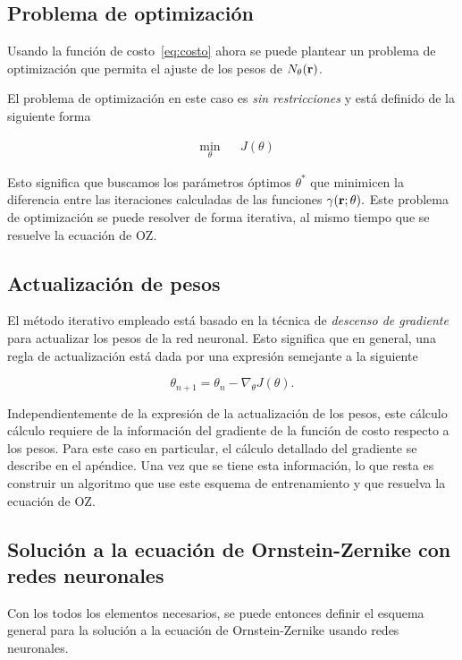 \subsection{Problema de optimización}
Usando la función de costo~\eqref{eq:costo} ahora se puede plantear un problema de optimización
que permita el ajuste de los pesos de $N_{\theta}(\mathbf{r})$.

El problema de optimización en este caso es \emph{sin restricciones} y está
definido de la siguiente forma

\begin{equation}
    \begin{aligned}
         & \underset{\theta}{\text{min}}
         &                               & J(\theta)
    \end{aligned}
    \label{eq:optimizacion}
\end{equation}

Esto significa que buscamos los parámetros óptimos $\theta^*$ que minimicen la diferencia
entre las iteraciones calculadas de las funciones $\gamma(\mathbf{r}; \theta).$
Este problema de optimización se puede resolver de forma iterativa, al mismo tiempo que
se resuelve la ecuación de OZ.

\subsection{Actualización de pesos}
El método iterativo empleado está basado en la técnica de \emph{descenso de gradiente}
para actualizar los pesos de la red neuronal.
Esto significa que en general, una regla de actualización está dada por una expresión
semejante a la siguiente

\begin{equation}
    \theta_{n+1} = \theta_n - \nabla_{\theta} J(\theta) .
    \label{eq:gradiente}
\end{equation}

Independientemente de la expresión de la actualización de los pesos, este cálculo
cálculo requiere de la información del gradiente de la función de costo respecto
a los pesos.
Para este caso en particular, el cálculo detallado del gradiente se describe en el apéndice.
Una vez que se tiene esta información, lo que resta es construir un algoritmo que use
este esquema de entrenamiento y que resuelva la ecuación de OZ.

\subsection{Solución a la ecuación de Ornstein-Zernike con redes neuronales}
Con los todos los elementos necesarios, se puede entonces definir el esquema general para
la solución a la ecuación de Ornstein-Zernike usando redes neuronales.


